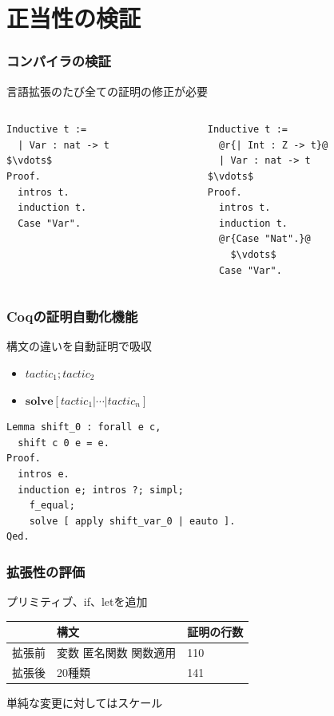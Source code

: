 \documentclass[dvipdfmx,cjk,xcolor=dvipsnames,envcountsect,notheorems,12pt]{beamer}
\theoremstyle{definition}
\newcommand{\keyword}[1]{\mathbf{#1}}
\begin{document}
\section{正当性の検証}

\begin{frame}[fragile]
	\frametitle{コンパイラの検証}
	\Large 言語拡張のたび全ての証明の修正が必要
	\begin{columns}
		\begin{column}{0.5\textwidth}
\begin{lstlisting}[frame=none]
Inductive t :=
  | Var : nat -> t
$\vdots$
Proof.
  intros t.
  induction t.
  Case "Var".
\end{lstlisting}
		\end{column}
		\begin{column}{0.5\textwidth}
\begin{lstlisting}[frame=none]
Inductive t :=
  @r{| Int : Z -> t}@
  | Var : nat -> t
$\vdots$
Proof.
  intros t.
  induction t.
  @r{Case "Nat".}@
    $\vdots$
  Case "Var".
\end{lstlisting}
		\end{column}
	\end{columns}
\end{frame}

\begin{frame}[fragile]
	\frametitle{Coqの証明自動化機能}
	\LARGE 構文の違いを自動証明で吸収
	\begin{center}
		\footnotesize
		\begin{itemize}
			\item $\mathit{tactic}_1;\mathit{tactic}_2$
			\item $\keyword{solve} [\mathit{tactic}_1 | \cdots | \mathit{tactic}_n]$
		\end{itemize}
	\end{center}

	\vfill

\begin{lstlisting}[]
Lemma shift_0 : forall e c,
  shift c 0 e = e.
Proof.
  intros e.
  induction e; intros ?; simpl;
    f_equal;
    solve [ apply shift_var_0 | eauto ].
Qed.
\end{lstlisting}
\end{frame}

\begin{frame}
	\frametitle{拡張性の評価}
	\LARGE プリミティブ、if、letを追加
	\begin{center}
		\large
		\begin{tabular}{l|ll}
			 & 構文 & 証明の行数 \\
			\hline
			拡張前 & 変数 匿名関数 関数適用 & 110 \\
			拡張後 & 20種類 & 141 \\
		\end{tabular}
	\end{center}

	\vfill

	単純な変更に対してはスケール
\end{frame}
\end{document}
